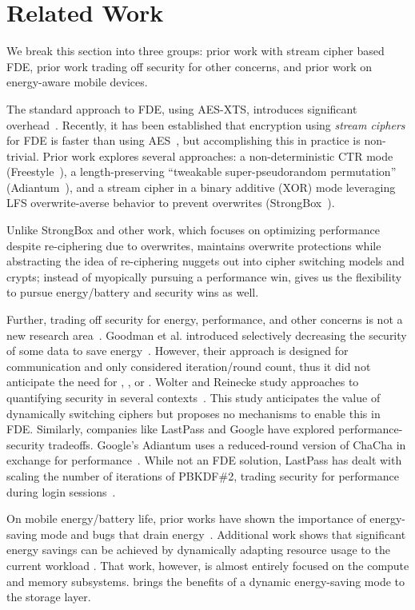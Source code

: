 \section{Related Work}\label{sec:related}

We break this section into three groups: prior work with stream cipher based
FDE, prior work trading off security for other concerns, and prior work on
energy-aware mobile devices.

 The standard approach to FDE, using AES-XTS,
introduces significant overhead~\cite{AESItself}. Recently, it has been
established that encryption using {\em stream ciphers} for FDE is faster than
using AES~\cite{StrongBox}, but accomplishing this in practice is non-trivial.
Prior work explores several approaches: a non-deterministic CTR mode
(Freestyle~\cite{Freestyle}), a length-preserving ``tweakable super-pseudorandom
permutation'' (Adiantum~\cite{Adiantum}), and a stream cipher in a binary
additive (XOR) mode leveraging LFS overwrite-averse behavior to prevent
overwrites (StrongBox~\cite{StrongBox}).

Unlike StrongBox and other work, which focuses on optimizing performance despite
re-ciphering due to overwrites, \sys maintains overwrite protections while
abstracting the idea of re-ciphering nuggets out into cipher switching models
and crypts; instead of myopically pursuing a performance win, \sys gives us the
flexibility to pursue energy/battery and security wins as well.

 Further, trading off security for
energy, performance, and other concerns is not a new research
area~\cite{ScalableSecurity, WolterReinecke, ZengChow1, HaleemEtAl,
LiOmiecinski, Merkel4, Merkle3}. Goodman et al. introduced selectively
decreasing the security of some data to save energy~\cite{ScalableSecurity}.
However, their approach is designed for communication and only considered
iteration/round count, thus it did not anticipate the need for \sysA, \sysB, or
\sysC. Wolter and Reinecke study approaches to quantifying security in several
contexts~\cite{WolterReinecke}. This study anticipates the value of dynamically
switching ciphers but proposes no mechanisms to enable this in FDE. Similarly,
companies like LastPass and Google have explored performance-security tradeoffs.
Google's Adiantum uses a reduced-round version of ChaCha in exchange for
performance~\cite{Adiantum}. While not an FDE solution, LastPass has dealt with
scaling the number of iterations of PBKDF\#2, trading security for performance
during login sessions~\cite{LastPass}.

 On mobile energy/battery life, prior works
have shown the importance of energy-saving mode and bugs that drain
energy~\cite{energy-doctor, power-aware}. Additional work shows that significant
energy savings can be achieved by dynamically adapting resource usage to the
current workload \cite{Mishra18,Flinn99,Hoffmann15,LeSueur11}. That work,
however, is almost entirely focused on the compute and memory subsystems. \sys
brings the benefits of a dynamic energy-saving mode to the storage layer.
